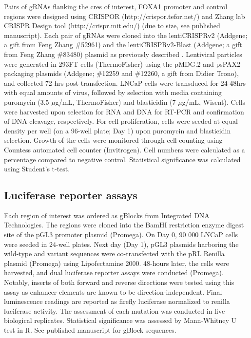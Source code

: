 Pairs of gRNAs flanking the \glspl{cre} of interest, FOXA1 promoter and control regions were designed using CRISPOR (http://crispor.tefor.net/) and Zhang lab CRISPR Design tool (http://crispr.mit.edu/) (due to size, see published manuscript).
Each pair of gRNAs were cloned into the lentiCRISPRv2 (Addgene; a gift from Feng Zhang \#52961) and the lentiCRISPRv2-Blast (Addgene; a gift from Feng Zhang \#83480) plasmid as previously described \cite{sanjanaImprovedVectorsGenomewide2014}.
Lentiviral particles were generated in 293FT cells (ThermoFisher) using the pMDG.2 and psPAX2 packaging plasmids (Addgene; \#12259 and \#12260, a gift from Didier Trono), and collected 72 hrs post transfection.
LNCaP cells were transduced for 24-48hrs with equal amounts of virus, followed by selection with media containing puromycin (3.5 $\mu$g/mL, ThermoFisher) and blasticidin (7 $\mu$g/mL, Wisent).
Cells were harvested upon selection for RNA and DNA for RT-PCR and confirmation of DNA cleavage, respectively.
For cell proliferation, cells were seeded at equal density per well (on a 96-well plate; Day 1) upon puromycin and blasticidin selection.
Growth of the cells were monitored through cell counting using Countess \texttrademark automated cell counter (Invitrogen).
Cell numbers were calculated as a percentage compared to negative control.
Statistical significance was calculated using Student's t-test.

\subsection{Luciferase reporter assays}

Each region of interest was ordered as gBlocks from Integrated DNA Technologies.
The regions were cloned into the BamHI restriction enzyme digest site of the pGL3 promoter plasmid (Promega).
On Day 0, 90 000 LNCaP cells were seeded in 24-well plates.
Next day (Day 1), pGL3 plasmids harboring the wild-type and variant sequences were co-transfected with the pRL Renilla plasmid (Promega) using Lipofectamine 2000.
48-hours later, the cells were harvested, and dual luciferase reporter assays were conducted (Promega).
Notably, inserts of both forward and reverse directions were tested using this assay as enhancer elements are known to be direction-independent.
Final luminescence readings are reported as firefly luciferase normalized to renilla luciferase activity.
The assessment of each mutation was conducted in five biological replicates.
Statistical significance was assessed by Mann-Whitney U test in R.
See published manuscript for gBlock sequences.

